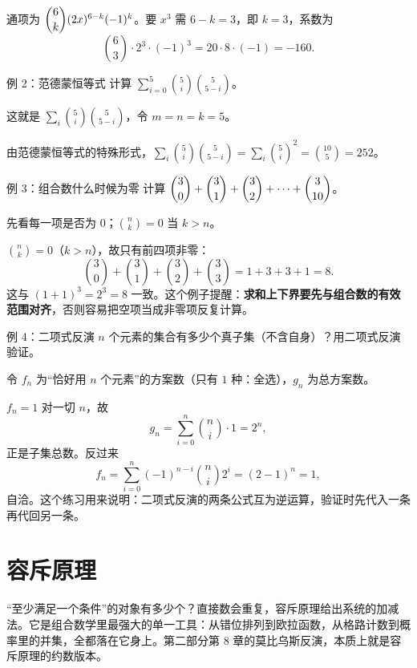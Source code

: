 \sol 通项为 $\dbinom6k(2x)^{6-k}(-1)^k$。要 $x^3$ 需 $6-k=3$，即 $k=3$，系数为
\[
\binom63\cdot2^3\cdot(-1)^3=20\cdot8\cdot(-1)=-160.
\]

\begin{problem}{例 2：范德蒙恒等式}
计算 $\sum_{i=0}^{5}\binom{5}{i}\binom{5}{5-i}$。
\end{problem}
\hint 这就是 $\sum_i\binom5i\binom5{5-i}$，令 $m=n=k=5$。

\sol 由范德蒙恒等式的特殊形式，$\sum_i\binom5i\binom5{5-i}=\sum_i\binom5i^2=\binom{10}{5}=252$。

\begin{problem}{例 3：组合数什么时候为零}
计算 $\dbinom30+\dbinom31+\dbinom32+\cdots+\dbinom{3}{10}$。
\end{problem}
\hint 先看每一项是否为 $0$；$\binom nk=0$ 当 $k>n$。

\sol $\binom nk=0$（$k>n$），故只有前四项非零：
\[
\binom30+\binom31+\binom32+\binom33=1+3+3+1=8.
\]
这与 $(1+1)^3=2^3=8$ 一致。这个例子提醒：\textbf{求和上下界要先与组合数的有效范围对齐}，否则容易把空项当成非零项反复计算。

\begin{problem}{例 4：二项式反演}
$n$ 个元素的集合有多少个真子集（不含自身）？用二项式反演验证。
\end{problem}
\hint 令 $f_n$ 为“恰好用 $n$ 个元素”的方案数（只有 $1$ 种：全选），$g_n$ 为总方案数。

\sol $f_n=1$ 对一切 $n$，故
\[
g_n=\sum_{i=0}^{n}\binom ni\cdot1=2^n,
\]
正是子集总数。反过来
\[
f_n=\sum_{i=0}^{n}(-1)^{n-i}\binom ni2^i=(2-1)^n=1,
\]
自洽。这个练习用来说明：二项式反演的两条公式互为逆运算，验证时先代入一条再代回另一条。

\chapter{容斥原理}
\begin{chapterintro}[章节导读]
“至少满足一个条件”的对象有多少个？直接数会重复，容斥原理给出系统的加减法。它是组合数学里最强大的单一工具：从错位排列到欧拉函数，从格路计数到概率里的并集，全都落在它身上。第二部分第 8 章的莫比乌斯反演，本质上就是容斥原理的约数版本。
\end{chapterintro}

